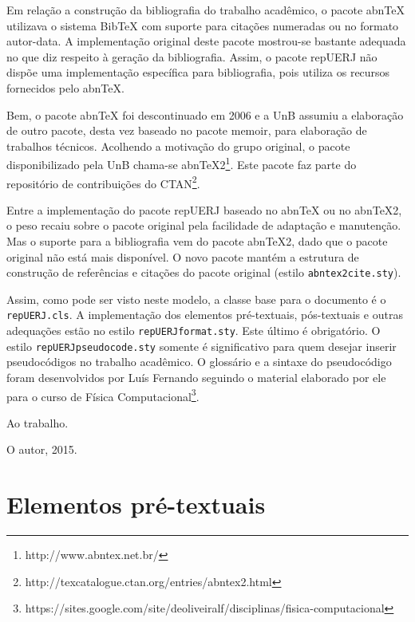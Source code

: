 \documentclass[a4paper,12pt,oneside,onecolumn,final,fleqn]{repUERJ}
\begin{document}
Em relação a construção da bibliografia do trabalho acadêmico, o pacote \textsf{abnTeX} utilizava o sistema \textsf{BibTeX} com suporte para citações numeradas ou no formato autor-data. A implementação original deste pacote mostrou-se bastante adequada no que diz respeito à geração da bibliografia. Assim, o pacote \textsf{repUERJ} não dispõe uma implementação específica para bibliografia, pois utiliza os recursos fornecidos pelo \textsf{abnTeX}.

Bem, o pacote \textsf{abnTeX} foi descontinuado em 2006 e a UnB assumiu a elaboração de outro pacote, desta vez baseado no pacote \textsf{memoir}, para elaboração de trabalhos técnicos. Acolhendo a motivação do grupo original, o pacote disponibilizado pela UnB chama-se \textsf{abnTeX2}\footnote{http://www.abntex.net.br/}. Este pacote faz parte do repositório de contribuições do CTAN\footnote{http://texcatalogue.ctan.org/entries/abntex2.html}.

Entre a implementação do pacote \textsf{repUERJ} baseado no \textsf{abnTeX}
ou no \textsf{abnTeX2}, o peso recaiu sobre o pacote original pela facilidade de adaptação e manutenção. Mas o suporte para a bibliografia vem do pacote \textsf{abnTeX2}, dado que o pacote original não está mais disponível. O novo pacote mantém a estrutura de construção de referências e citações do pacote original (estilo \texttt{abntex2cite.sty}).

Assim, como pode ser visto neste modelo, a classe base para o documento é o \texttt{repUERJ.cls}. A implementação dos elementos pré-textuais, pós-textuais e outras adequações estão no estilo \texttt{repUERJformat.sty}. Este último é obrigatório. O estilo \texttt{repUERJpseudocode.sty} somente é significativo para quem desejar inserir pseudocódigos no trabalho acadêmico. O glossário e a sintaxe do pseudocódigo foram desenvolvidos por Luís Fernando seguindo o material elaborado por ele para o curso de Física Computacional\footnote{https://sites.google.com/site/deoliveiralf/disciplinas/fisica-computacional}.

Ao trabalho.\\

\begin{flushright}O autor, 2015.\end{flushright}

\chapter{Elementos pré-textuais}
\end{document}
